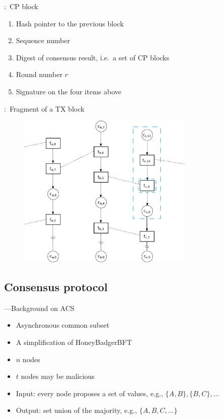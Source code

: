 \documentclass{beamer}
\begin{document}
\begin{frame}{\subsecname:~CP block}
  \begin{enumerate}
    \item Hash pointer to the previous block
    \item Sequence number
    \item Digest of consensus result, i.e.~a set of CP blocks
    \item Round number $r$
    \item Signature on the four items above
  \end{enumerate}
\end{frame}

\begin{frame}{\subsecname:~Fragment of a TX block}
  \begin{figure}[h]
  \includegraphics[width=0.75\textwidth]{trustchain-good-cp-frag}
  \centering
  \end{figure}
\end{frame}

\subsection{Consensus protocol}

\begin{frame}{\subsecname---Background on ACS}
  \begin{itemize}
    \item Asynchronous common subset
    \item A simplification of HoneyBadgerBFT~\cite{miller2016honey}
    \item $n$ nodes
    \item $t$ nodes may be malicious
    \item Input: every node proposes a set of values, e.g., $\{A, B\}, \{B, C\}, \dots$
    \item Output: set union of the majority, e.g., $\{A, B, C, \dots \}$
  \end{itemize}
\end{frame}
\end{document}
